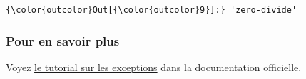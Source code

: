 \begin{Verbatim}[commandchars=\\\{\},frame=single,framerule=0.3mm,rulecolor=\color{cellframecolor}]
{\color{outcolor}Out[{\color{outcolor}9}]:} 'zero-divide'
\end{Verbatim}
            
    \hypertarget{pour-en-savoir-plus}{%
\subsubsection{Pour en savoir plus}\label{pour-en-savoir-plus}}

    Voyez
\href{https://docs.python.org/3/tutorial/errors.html\#handling-exceptions}{le
tutorial sur les exceptions} dans la documentation officielle.


    
    
    
